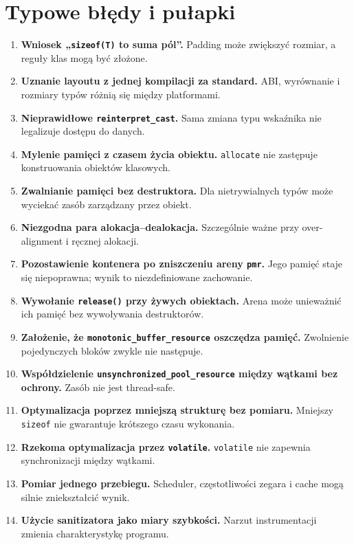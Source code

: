 \section{Typowe błędy i pułapki}

\begin{enumerate}
\item \textbf{Wniosek „\texttt{sizeof(T)} to suma pól”.}
      Padding może zwiększyć rozmiar, a reguły klas mogą być złożone.
\item \textbf{Uznanie layoutu z jednej kompilacji za standard.}
      ABI, wyrównanie i rozmiary typów różnią się między platformami.
\item \textbf{Nieprawidłowe \texttt{reinterpret\_cast}.}
      Sama zmiana typu wskaźnika nie legalizuje dostępu do danych.
\item \textbf{Mylenie pamięci z czasem życia obiektu.}
      \texttt{allocate} nie zastępuje konstruowania obiektów klasowych.
\item \textbf{Zwalnianie pamięci bez destruktora.}
      Dla nietrywialnych typów może wyciekać zasób zarządzany przez obiekt.
\item \textbf{Niezgodna para alokacja--dealokacja.}
      Szczególnie ważne przy over-alignment i ręcznej alokacji.
\item \textbf{Pozostawienie kontenera po zniszczeniu areny \texttt{pmr}.}
      Jego pamięć staje się niepoprawna; wynik to niezdefiniowane zachowanie.
\item \textbf{Wywołanie \texttt{release()} przy żywych obiektach.}
      Arena może unieważnić ich pamięć bez wywoływania destruktorów.
\item \textbf{Założenie, że \texttt{monotonic\_buffer\_resource} oszczędza
      pamięć.} Zwolnienie pojedynczych bloków zwykle nie następuje.
\item \textbf{Współdzielenie \texttt{unsynchronized\_pool\_resource}
      między wątkami bez ochrony.} Zasób nie jest thread-safe.
\item \textbf{Optymalizacja poprzez mniejszą strukturę bez pomiaru.}
      Mniejszy \texttt{sizeof} nie gwarantuje krótszego czasu wykonania.
\item \textbf{Rzekoma optymalizacja przez \texttt{volatile}.}
      \texttt{volatile} nie zapewnia synchronizacji między wątkami.
\item \textbf{Pomiar jednego przebiegu.} Scheduler, częstotliwości
      zegara i cache mogą silnie zniekształcić wynik.
\item \textbf{Użycie sanitizatora jako miary szybkości.}
      Narzut instrumentacji zmienia charakterystykę programu.
\end{enumerate}

